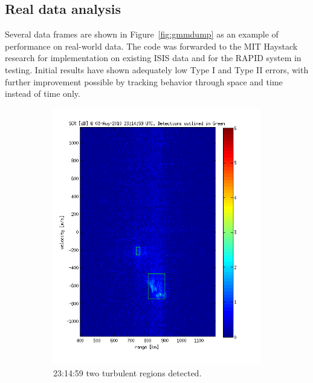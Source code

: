 \subsection{Real data analysis}
Several data frames are shown in Figure~\ref{fig:gmmdump} as an example of performance on real-world data. 
The code \citet{cviono} was forwarded to the MIT Haystack research for implementation on existing ISIS data and for the RAPID system in testing.
Initial results have shown adequately low Type I and Type II errors, with further improvement possible by tracking behavior through space and time instead of time only.
\begin{figure}\centering
    \begin{subfigure}[t]{0.45\linewidth}
        \includegraphics[width=\linewidth]{gfx/out-000}	
        \caption{23:14:59 two turbulent regions detected.}
    \end{subfigure}
    \quad
    \begin{subfigure}[t]{0.45\linewidth}

\end{subfigure}
\end{figure}

